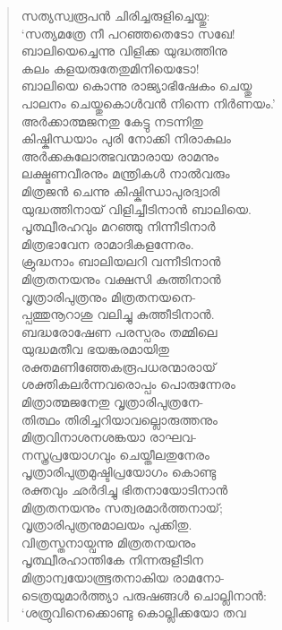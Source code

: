 \begin{verse}
സത്യസ്വരൂപന്‍ ചിരിച്ചരുളിച്ചെയ്തു:\\
‘സത്യമത്രേ നീ പറഞ്ഞതെടോ സഖേ!\\
ബാലിയെച്ചെന്നു വിളിക്ക യുദ്ധത്തിനു\\
കലം കളയരുതേതുമിനിയെടോ!\\
ബാലിയെ കൊന്നു രാജ്യാഭിഷേകം ചെയ്തു\\
പാലനം ചെയ്തുകൊള്‍വന്‍ നിന്നെ നിര്‍ണയം.’\\
അര്‍ക്കാത്മജനതു കേട്ടു നടന്നിതു\\
കിഷ്കിന്ധയാം പുരി നോക്കി നിരാകുലം\\
അര്‍ക്കകുലോത്ഭവന്മാരായ രാമനും\\
ലക്ഷ്മണവീരനും മന്ത്രികള്‍ നാല്‍വരും\\
മിത്രജന്‍ ചെന്നു കിഷ്കിന്ധാപുരദ്വാരി\\
യുദ്ധത്തിനായ് വിളിച്ചീടിനാന്‍ ബാലിയെ.\\
പൃത്ഥ്വീരഹവും മറഞ്ഞു നിന്നീടിനാര്‍\\
മിത്രഭാവേന രാമാദികളന്നേരം.\\
ക്രുദ്ധനാം ബാലിയലറി വന്നീടിനാന്‍\\
മിത്രതനയനും വക്ഷസി കുത്തിനാന്‍\\
വൃത്രാരിപുത്രനും മിത്രതനയനെ-\\
പ്പത്തുനൂറാശു വലിച്ചു കുത്തീടിനാന്‍.\\
ബദ്ധരോഷേണ പരസ്പരം തമ്മിലെ\\
യുദ്ധമതീവ ഭയങ്കരമായിതു\\
രക്തമണിഞ്ഞേകരൂപധരന്മാരായ്\\
ശക്തികലര്‍ന്നവരൊപ്പം പൊരുന്നേരം\\
മിത്രാത്മജനേതു വൃത്രാരിപുത്രനേ-\\
തിത്ഥം തിരിച്ചറിയാവല്ലൊരുത്തനും\\
മിത്രവിനാശനശങ്കയാ രാഘവ-\\
നസ്ത്രപ്രയോഗവും ചെയ്തീലതുനേരം\\
പൃത്രാരിപുത്രമുഷ്ടിപ്രയോഗം കൊണ്ടു\\
രക്തവും ഛര്‍ദിച്ചു ഭിതനായോടിനാന്‍\\
മിത്രതനയനും സത്വരമാര്‍ത്തനായ്;\\
വൃത്രാരിപുത്രനുമാലയം പുക്കിതു.\\
വിത്രസ്തനായ്വന്നു മിത്രതനയനും\\
പൃത്ഥ്വീരഹാന്തികേ നിന്നരുളീടിന\\
മിത്രാന്വയോത്ഭൂതനാകിയ രാമനോ-\\
ടെത്രയുമാര്‍ത്ത്യാ പരുഷങ്ങള്‍ ചൊല്ലിനാന്‍:\\
‘ശത്രുവിനെക്കൊണ്ടു കൊല്ലിക്കയോ തവ\\

\end{verse}
